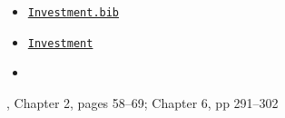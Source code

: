 \begin{itemize}
\item[Bib:] \texttt{\href{http://www.econ2.jhu.edu/people/ccarroll/courses/Choice/Syllabus/Investment.bib}{Investment.bib}}
\item[Handouts:]  \texttt{\href{https://jhu-econ.github.io/intertemporal-choice/content/investment}{Investment}}
\item[Readings:]
\end{itemize}

\providecommand{\blf}{\cite{blanchard&fischer:text}}
\providecommand{\ro}{\cite{romer:text}}

\bi
\reqd \blf, Chapter 2, pages 58--69; Chapter 6, pp 291--302
\recm \cite{hall&jorgenson:i}
\reqd \cite{hayashi:q}
\reqd \cite{abel&eberly:unified}
\reqd \cite{chh:reconsider}
\ei

